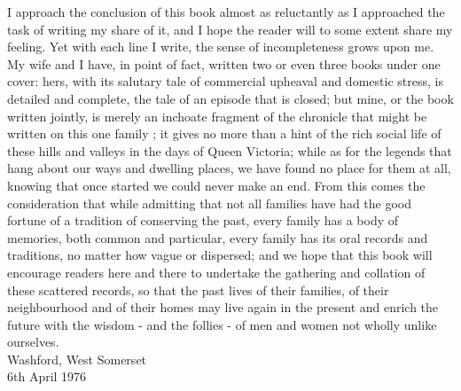 
I approach the conclusion of this book almost as reluctantly as I approached the task of writing my share of it, and I hope the reader will to some extent share my feeling. Yet with each line I write, the sense of incompleteness grows upon me. My wife and I have, in point of fact, written two or even three books under one cover: hers, with its salutary tale of commercial upheaval and domestic stress, is detailed and complete, the tale of an episode that is closed; but mine, or the book written jointly, is merely an inchoate fragment of the chronicle that might be written on this one family ; it gives no more than a hint of the rich social life of these hills and valleys in the days of Queen Victoria; while as for the legends that hang about our ways and dwelling places, we have found no place for them at all, knowing that once started we could never make an end.
From this comes the consideration that while admitting that not all families have had the good fortune of a tradition of conserving the past, every family has a body of memories, both common and particular, every family has its oral records and traditions, no matter how vague or dispersed; and we hope that this book will encourage readers here and there to undertake the gathering and collation of these scattered records, so that the past lives of their families, of their neighbourhood and of their homes may live again in the present and enrich the future with the wisdom - and the follies - of men and women not wholly unlike ourselves. \\

Washford, West Somerset \\
6th April 1976
